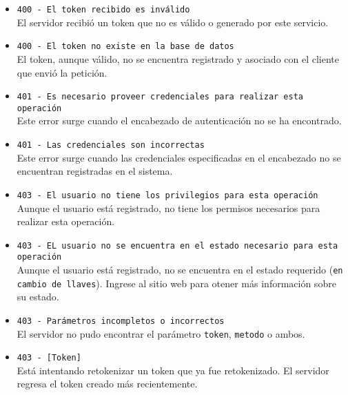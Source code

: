 \begin{itemize}

  \item \verb|400 - El token recibido es inválido| \\
    El servidor recibió un token que no es válido o generado por este
    servicio.

  \item \verb|400 - El token no existe en la base de datos| \\
    El token, aunque válido, no se encuentra registrado y asociado con
    el cliente que envió la petición.

  \item \verb|401 - Es necesario proveer credenciales para realizar esta operación| \\
    Este error surge cuando el encabezado de autenticación no se ha
    encontrado.

  \item \verb|401 - Las credenciales son incorrectas| \\
    Este error surge cuando las credenciales especificadas en el
    encabezado no se encuentran registradas en el sistema.

  \item \verb|403 - El usuario no tiene los privilegios para esta operación| \\
    Aunque el usuario está registrado, no tiene los permisos necesarios
    para realizar esta operación.

  \item \verb|403 - EL usuario no se encuentra en el estado necesario para esta operación| \\
    Aunque el usuario está registrado, no se encuentra en el estado
    requerido (\verb|en cambio de llaves|). Ingrese al sitio web
    para otener más información sobre su estado.

  \item \verb|403 - Parámetros incompletos o incorrectos| \\
    El servidor no pudo encontrar el parámetro \verb|token|,
    \verb|metodo| o ambos.

  \item \verb|403 - [Token]| \\
    Está intentando retokenizar un token que ya fue retokenizado. El
    servidor regresa el token creado más recientemente.

\end{itemize}
